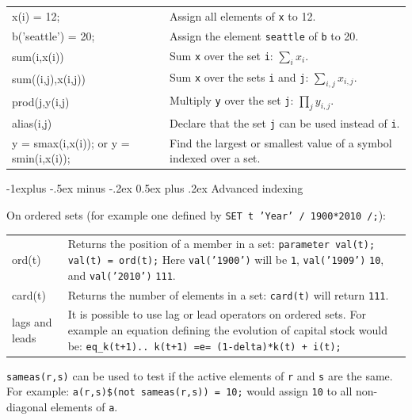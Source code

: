 \documentclass[10pt,landscape,a4paper]{article}
\makeatletter
\renewcommand{\subsection}{\@startsection{subsection}{2}{0mm}%
                                {-1explus -.5ex minus -.2ex}%
                                {0.5ex plus .2ex}%
                                {\normalfont\normalsize\bfseries}}
\makeatother
\begin{document}
\begin{multicols}{2}
\begin{tabularx}{\columnwidth}{@{}>{\ttfamily}lX@{}}
x(i) = 12; & Assign all elements of \texttt{x} to 12.\\
b('seattle') = 20; & Assign the element \texttt{seattle} of \texttt{b} to 20.\\
sum(i,x(i)) & Sum \texttt{x} over the set \texttt{i}: $\sum_{i}x_{i}$.\\
sum((i,j),x(i,j)) & Sum \texttt{x} over the sets \texttt{i} and \texttt{j}: $\sum_{i,j}x_{i,j}$.\\
prod(j,y(i,j) & Multiply \texttt{y} over the set \texttt{j}:
$\prod_{j}y_{i,j}$.\\
alias(i,j) & Declare that the set \texttt{j} can be used instead of
\texttt{i}.\\
y = smax(i,x(i)); \textrm{or} y = smin(i,x(i)); & Find the largest or smallest
value of a symbol indexed over a set.
\end{tabularx}

\subsection{Advanced indexing}

On ordered sets (for example one defined by \texttt{SET t 'Year' / 1900*2010 /;}):
\begin{tabularx}{\columnwidth}{@{}>{\ttfamily}l>{\raggedright\arraybackslash}X@{}}
ord(t)& Returns the position of a member in a set:\linebreak{}
\texttt{parameter val(t);}\linebreak{}
\texttt{val(t) = ord(t);}\linebreak{}
Here \texttt{val('1900')} will be \texttt{1}, \texttt{val('1909')} \texttt{10}, and \texttt{val('2010')} \texttt{111}.\\
card(t) & Returns the number of elements in a set: \texttt{card(t)} will return \texttt{111}.\\
\textrm{lags and leads} & It is possible to use lag or lead operators on ordered
sets. For example an equation defining the evolution of capital stock would
be:\linebreak{}
\texttt{eq\_k(t+1).. k(t+1) =e= (1-delta)*k(t) + i(t);}
\end{tabularx}

\texttt{sameas(r,s)} can be used to test if the active elements of \texttt{r}
and \texttt{s} are the same. For example: \texttt{a(r,s)\$(not sameas(r,s)) =
  10;} would assign \texttt{10} to all non-diagonal elements of \texttt{a}.


\end{multicols}
\end{document}
